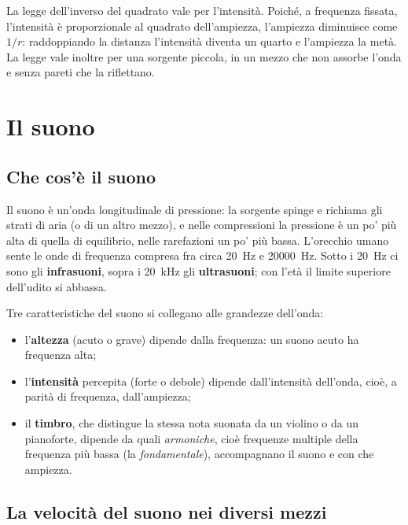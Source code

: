 \begin{attenzione}
La legge dell'inverso del quadrato vale per l'intensità. Poiché, a frequenza fissata, l'intensità è proporzionale al quadrato dell'ampiezza, l'ampiezza diminuisce come $1/r$: raddoppiando la distanza l'intensità diventa un quarto e l'ampiezza la metà. La legge vale inoltre per una sorgente piccola, in un mezzo che non assorbe l'onda e senza pareti che la riflettano.
\end{attenzione}



\section{Il suono}
\label{sec:ud4-suono}

\subsection{Che cos'è il suono}

Il suono è un'onda longitudinale di pressione: la sorgente spinge e richiama gli strati di aria (o di un altro mezzo), e nelle compressioni la pressione è un po' più alta di quella di equilibrio, nelle rarefazioni un po' più bassa. L'orecchio umano sente le onde di frequenza compresa fra circa \SI{20}{\hertz} e \SI{20000}{\hertz}. Sotto i \SI{20}{\hertz} ci sono gli \textbf{infrasuoni}, sopra i \SI{20}{\kilo\hertz} gli \textbf{ultrasuoni}; con l'età il limite superiore dell'udito si abbassa.

Tre caratteristiche del suono si collegano alle grandezze dell'onda:
\begin{itemize}
  \item l'\textbf{altezza} (acuto o grave) dipende dalla frequenza: un suono acuto ha frequenza alta;
  \item l'\textbf{intensità} percepita (forte o debole) dipende dall'intensità dell'onda, cioè, a parità di frequenza, dall'ampiezza;
  \item il \textbf{timbro}, che distingue la stessa nota suonata da un violino o da un pianoforte, dipende da quali \emph{armoniche}, cioè frequenze multiple della frequenza più bassa (la \emph{fondamentale}), accompagnano il suono e con che ampiezza.
\end{itemize}

\subsection{La velocità del suono nei diversi mezzi}

